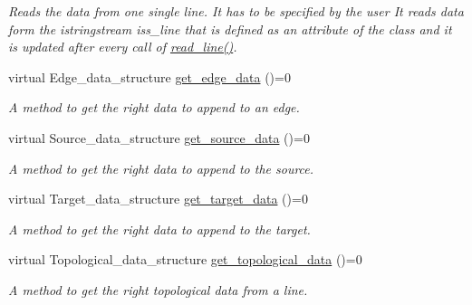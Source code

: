 \begin{DoxyCompactItemize}
\begin{DoxyCompactList}\small\item\em Reads the data from one single line. It has to be specified by the user  It reads data form the istringstream iss\_\-line that is defined as an attribute of the class and it is updated after every call of \hyperlink{classnew__reader__class_a95f6bf521a51258b14e5b5755fe5e75f}{read\_\-line()}. \item\end{DoxyCompactList}\item 
\hypertarget{classnew__reader__class_ab01559704d4f1d609e732d77808b502e}{
virtual Edge\_\-data\_\-structure \hyperlink{classnew__reader__class_ab01559704d4f1d609e732d77808b502e}{get\_\-edge\_\-data} ()=0}
\label{classnew__reader__class_ab01559704d4f1d609e732d77808b502e}

\begin{DoxyCompactList}\small\item\em A method to get the right data to append to an edge. \item\end{DoxyCompactList}\item 
\hypertarget{classnew__reader__class_a572d6d26042e4b4d1f402ab0d350d06a}{
virtual Source\_\-data\_\-structure \hyperlink{classnew__reader__class_a572d6d26042e4b4d1f402ab0d350d06a}{get\_\-source\_\-data} ()=0}
\label{classnew__reader__class_a572d6d26042e4b4d1f402ab0d350d06a}

\begin{DoxyCompactList}\small\item\em A method to get the right data to append to the source. \item\end{DoxyCompactList}\item 
\hypertarget{classnew__reader__class_acc5596fe13aadce75d0dcb2554783b37}{
virtual Target\_\-data\_\-structure \hyperlink{classnew__reader__class_acc5596fe13aadce75d0dcb2554783b37}{get\_\-target\_\-data} ()=0}
\label{classnew__reader__class_acc5596fe13aadce75d0dcb2554783b37}

\begin{DoxyCompactList}\small\item\em A method to get the right data to append to the target. \item\end{DoxyCompactList}\item 
\hypertarget{classnew__reader__class_ae6355323cdaad87a64c01b8c0fdcff39}{
virtual Topological\_\-data\_\-structure \hyperlink{classnew__reader__class_ae6355323cdaad87a64c01b8c0fdcff39}{get\_\-topological\_\-data} ()=0}
\label{classnew__reader__class_ae6355323cdaad87a64c01b8c0fdcff39}

\begin{DoxyCompactList}\small\item\em A method to get the right topological data from a line. \item\end{DoxyCompactList}\end{DoxyCompactItemize}
